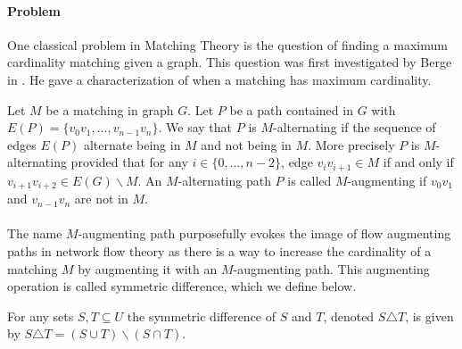 \paragraph{Problem} One classical problem in Matching Theory is the question of finding a maximum cardinality matching given a graph. This question was first investigated by Berge in \cite{berge1957two}. He gave a characterization of when a matching has maximum cardinality. 
\begin{definition} Let $M$ be a matching in graph $G$. Let $P$ be a path contained in $G$ with $E(P) = \{v_0v_1, \dots, v_{n-1}v_n\}$. We say that $P$ is $M$-alternating if the sequence of edges $E(P)$ alternate being in $M$ and not being in $M$. More precisely $P$ is $M$-alternating provided that for any $i \in \{0, \dots, n-2\}$, edge $v_iv_{i+1} \in M$ if and only if $v_{i+1}v_{i+2} \in E(G) \backslash M$. An $M$-alternating path $P$ is called $M$-augmenting if $v_0v_1$ and $v_{n-1}v_n$ are not in $M$.
\end{definition} 
\paragraph{}
The name $M$-augmenting path purposefully evokes the image of flow augmenting paths in network flow theory as there is a way to increase the cardinality of a matching $M$ by augmenting it with an $M$-augmenting path. This augmenting operation is called symmetric difference, which we define below.
\begin{definition} For any sets $S,T \subseteq U$ the symmetric difference of $S$ and $T$, denoted $S \triangle T$, is given by $S \triangle T = (S \cup T) \backslash (S \cap T)$. 
\end{definition}
